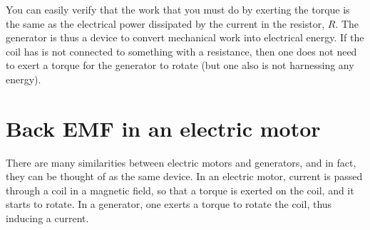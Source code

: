 You can easily verify that the work that you must do by exerting the torque is the same as the electrical power dissipated by the current in the resistor, $R$. The generator is thus a device to convert mechanical work into electrical energy. If the coil has is not connected to something with a resistance, then one does not need to exert a torque for the generator to rotate (but one also is not harnessing any energy). 

\section{Back EMF in an electric motor}
There are many similarities between electric motors and generators, and in fact, they can be thought of as the same device. In an electric motor, current is passed through a coil in a magnetic field, so that a torque is exerted on the coil, and it starts to rotate. In a generator, one exerts a torque to rotate the coil, thus inducing a current. 

